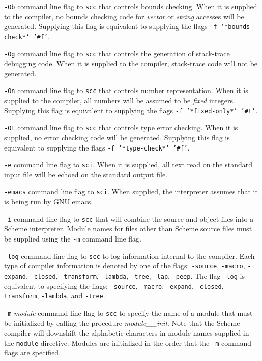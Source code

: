 \documentclass[10pt,twocolumn]{article}
\begin{document}
\texttt{-Ob} command line flag to \texttt{scc} that controls bounds checking.
When it is supplied to the compiler, no bounds checking code for
\emph{vector} or \emph{string} accesses will be generated.  Supplying this
flag is equivalent to supplying the flags \texttt{-f '*bounds-check*'
'\#f'}.

\texttt{-Og} command line flag to \texttt{scc} that controls the generation of
stack-trace debugging code. When it is supplied to the compiler,
stack-trace code will not be generated.

\texttt{-On} command line flag to \texttt{scc} that controls number
representation. When it is supplied to the compiler, all numbers will
be assumed to be \emph{fixed} integers.  Supplying this flag is
equivalent to supplying the flags \texttt{-f '*fixed-only*' '\#t'}.

\texttt{-Ot} command line flag to \texttt{scc} that controls type error
checking. When it is supplied, no error checking code will be
generated. Supplying this flag is equivalent to supplying the flags
\texttt{-f '*type-check*' '\#f'}.

\texttt{-e} command line flag to \texttt{sci}.  When it is supplied, all text
read on the standard input file will be echoed on the standard output
file.

\texttt{-emacs} command line flag to \texttt{sci}.  When supplied, the
interpreter assumes that it is being run by GNU emacs.

\texttt{-i} command line flag to \texttt{scc} that will combine the source and
object files into a Scheme interpreter.  Module names for files other
than Scheme source files must be supplied using the \texttt{-m} command
line flag.

\texttt{-log} command line flag to \texttt{scc} to log information internal to
the compiler.  Each type of compiler information is denoted by one of
the flags: \texttt{-source}, \texttt{-macro}, \texttt{-expand}, \texttt{-closed},
\texttt{-transform}, \texttt{-lambda}, \texttt{-tree}, \texttt{-lap}, \texttt{-peep}.  The
flag \texttt{-log} is equivalent to specifying the flags: \texttt{-source},
\texttt{-macro}, \texttt{-expand}, \texttt{-closed}, \texttt{-transform}, \texttt{-lambda}, and
\texttt{-tree}.

\texttt{-m} \emph{module} command line flag to \texttt{scc} to specify the name of
a module that must be initialized by calling the procedure
\emph{module\_\_init}.  Note that the Scheme compiler will downshift the
alphabetic characters in module names supplied in the \texttt{module}
directive.  Modules are initialized in the order that the \texttt{-m} command
flags are specified.
\end{document}
